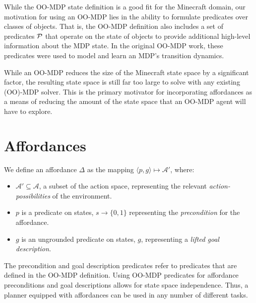\documentclass[conference]{IEEEtran}
\begin{document}
While the OO-MDP state definition is a good fit for the Minecraft
domain, our motivation for using an OO-MDP lies in the ability to
formulate predicates over classes of objects. That is, the OO-MDP
definition also includes a set of predicates ${\cal P}$ that operate
on the state of objects to provide additional high-level information
about the MDP state. 
In the original OO-MDP work,
these predicates were used to model and learn an MDP's transition
dynamics.

While an OO-MDP reduces the size of the Minecraft state space
by a significant factor, the resulting state space is still far too large to
solve with any existing (OO)-MDP solver. This is the primary motivator
for incorporating affordances as a means of reducing the amount of the
state space that an OO-MDP agent will have to explore.

\section{Affordances}
\label{sec:affordances}

We define an affordance $\Delta$ 
as the mapping $\langle p,g\rangle \longmapsto \mathcal{A}'$,
where:
\begin{itemize}
\item[] $\mathcal{A}' \subseteq \mathcal{A}$, a subset of the action space, representing the relevant {\it action-possibilities} of the environment.
\item[] $p$ is a predicate on states, $s \longrightarrow \{$0$, 1\}$
  representing the {\em precondition} for the affordance.
\item[] $g$ is an ungrounded predicate on states, $g$, representing a {\it lifted goal description}.
\end{itemize}
The precondition and goal description predicates refer to predicates that are defined in the OO-MDP definition. 
Using OO-MDP predicates for affordance preconditions and goal descriptions 
allows for state space independence. Thus, a planner equipped with
affordances can be used in any number of different tasks. 
\end{document}
